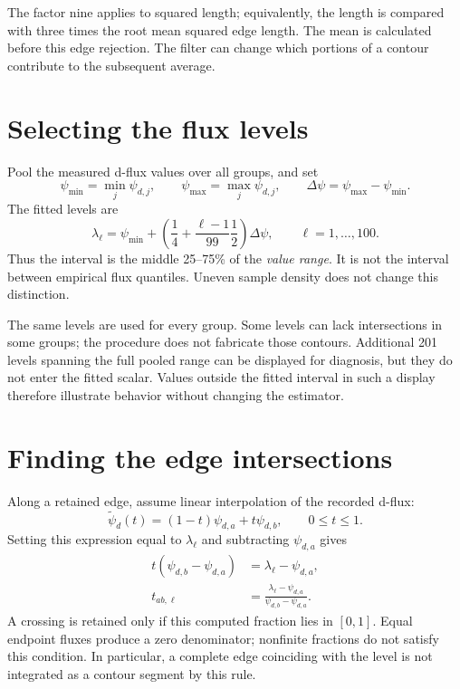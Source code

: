 The factor nine applies to squared length; equivalently, the length is compared with three times the root mean squared edge length. The mean is calculated before this edge rejection. The filter can change which portions of a contour contribute to the subsequent average.

\section{Selecting the flux levels}
Pool the measured d-flux values over all groups, and set
\begin{equation}
\psi_{\min}=\min_j\psi_{d,j},\qquad
\psi_{\max}=\max_j\psi_{d,j},\qquad
\Delta\psi=\psi_{\max}-\psi_{\min}.
\end{equation}
The fitted levels are
\begin{equation}\label{eq:contour-levels}
\lambda_\ell=\psi_{\min}
+\left(\frac14+\frac{\ell-1}{99}\frac12\right)\Delta\psi,
\qquad \ell=1,\ldots,100.
\end{equation}
Thus the interval is the middle 25--75\% of the \emph{value range}. It is not the interval between empirical flux quantiles. Uneven sample density does not change this distinction.

The same levels are used for every group. Some levels can lack intersections in some groups; the procedure does not fabricate those contours. Additional 201 levels spanning the full pooled range can be displayed for diagnosis, but they do not enter the fitted scalar. Values outside the fitted interval in such a display therefore illustrate behavior without changing the estimator.

\section{Finding the edge intersections}
Along a retained edge, assume linear interpolation of the recorded d-flux:
\begin{equation}
\widetilde\psi_d(t)=(1-t)\psi_{d,a}+t\psi_{d,b},
\qquad 0\le t\le1.
\end{equation}
Setting this expression equal to $\lambda_\ell$ and subtracting $\psi_{d,a}$ gives
\begin{align}
t(\psi_{d,b}-\psi_{d,a})&=\lambda_\ell-\psi_{d,a},\\
t_{ab,\ell}&=\frac{\lambda_\ell-\psi_{d,a}}
{\psi_{d,b}-\psi_{d,a}}.\label{eq:edge-fraction}
\end{align}
A crossing is retained only if this computed fraction lies in $[0,1]$. Equal endpoint fluxes produce a zero denominator; nonfinite fractions do not satisfy this condition. In particular, a complete edge coinciding with the level is not integrated as a contour segment by this rule.

